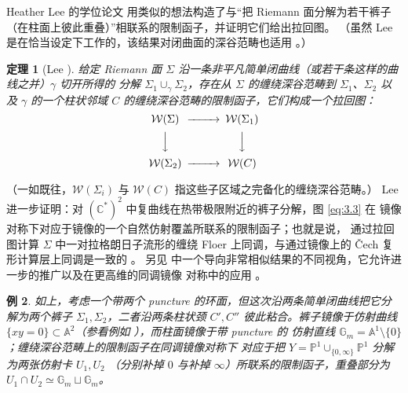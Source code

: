 \documentclass[UTF8,a4paper,11pt,fontset=windows]{ctexart}
\theoremstyle{cnthm}
\newtheorem{thm}{定理}[section]
\newtheorem{exmp}[thm]{例}
\numberwithin{equation}{section}
\newcommand{\C}{\mathbb{C}}
\newcommand{\WW}{\mathcal{W}}         %
\begin{document}
Heather Lee 的学位论文 \cite{r68} 用类似的想法构造了与“把 Riemann 面分解为若干裤子
（在柱面上彼此重叠）”相联系的限制函子，并证明它们给出拉回图。
（虽然 Lee 是在恰当设定下工作的，该结果对闭曲面的深谷范畴也适用 \cite{r25}。）

\begin{thm}[Lee \cite{r68}]\label{thm:3.3}
给定 Riemann 面 $\Sigma$ 沿一条非平凡简单闭曲线（或若干条这样的曲线之并）$\gamma$ 切开所得的
分解 $\Sigma_1\cup_{\gamma}\Sigma_2$，存在从 $\Sigma$ 的缠绕深谷范畴到 $\Sigma_1$、$\Sigma_2$
以及 $\gamma$ 的一个柱状邻域 $C$ 的缠绕深谷范畴的限制函子，它们构成一个拉回图：
\begin{equation}\label{eq:3.3}
\begin{CD}
\WW(\Sigma)  @>>>  \WW(\Sigma_1)\\
@VVV         @VVV\\
\WW(\Sigma_2) @>>> \WW(C)
\end{CD}
\end{equation}
\end{thm}

（一如既往，$\WW(\Sigma_i)$ 与 $\WW(C)$ 指这些子区域之完备化的缠绕深谷范畴。）
Lee 进一步证明：对 $(\C^{*})^{2}$ 中复曲线在热带极限附近的裤子分解，图 \eqref{eq:3.3} 在
镜像对称下对应于镜像的一个自然仿射覆盖所联系的限制函子；也就是说，
通过拉回图计算 $\Sigma$ 中一对拉格朗日子流形的缠绕 Floer 上同调，与通过镜像上的
\v{C}ech 复形计算层上同调是一致的 \cite{r68}。
另见 \cite{r83} 中一个导向非常相似结果的不同视角，它允许进一步的推广以及在更高维的同调镜像
对称中的应用 \cite{r74}。


\begin{exmp}\label{ex:3.4}
如上，考虑一个带两个 puncture 的环面，但这次沿两条简单闭曲线把它分解为两个裤子
$\Sigma_1,\Sigma_2$，二者沿两条柱状颈 $C',C''$ 彼此粘合。裤子镜像于仿射曲线
$\{xy=0\}\subset\mathbb{A}^{2}$（参看例如 \cite[第 3 节]{r23}），而柱面镜像于带 puncture 的
仿射直线 $\mathbb{G}_m=\mathbb{A}^{1}\setminus\{0\}$；缠绕深谷范畴上的限制函子在同调镜像对称下
对应于把 $Y=\mathbb{P}^{1}\cup_{\{0,\infty\}}\mathbb{P}^{1}$ 分解为两张仿射卡 $U_1,U_2$
（分别补掉 $0$ 与补掉 $\infty$）所联系的限制函子，重叠部分为
$U_1\cap U_2\simeq\mathbb{G}_m\sqcup\mathbb{G}_m$。
\end{exmp}
\end{document}
